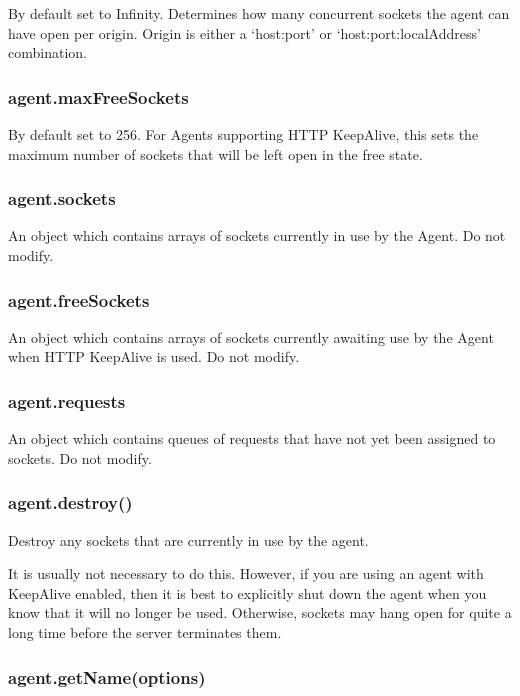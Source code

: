By default set to Infinity. Determines how many concurrent sockets the
agent can have open per origin. Origin is either a `host:port' or
`host:port:localAddress' combination.

\subsubsection{agent.maxFreeSockets}\label{agent.maxfreesockets}

By default set to 256. For Agents supporting HTTP KeepAlive, this sets
the maximum number of sockets that will be left open in the free state.

\subsubsection{agent.sockets}\label{agent.sockets}

An object which contains arrays of sockets currently in use by the
Agent. Do not modify.

\subsubsection{agent.freeSockets}\label{agent.freesockets}

An object which contains arrays of sockets currently awaiting use by the
Agent when HTTP KeepAlive is used. Do not modify.

\subsubsection{agent.requests}\label{agent.requests}

An object which contains queues of requests that have not yet been
assigned to sockets. Do not modify.

\subsubsection{agent.destroy()}\label{agent.destroy}

Destroy any sockets that are currently in use by the agent.

It is usually not necessary to do this. However, if you are using an
agent with KeepAlive enabled, then it is best to explicitly shut down
the agent when you know that it will no longer be used. Otherwise,
sockets may hang open for quite a long time before the server terminates
them.

\subsubsection{agent.getName(options)}\label{agent.getnameoptions}

